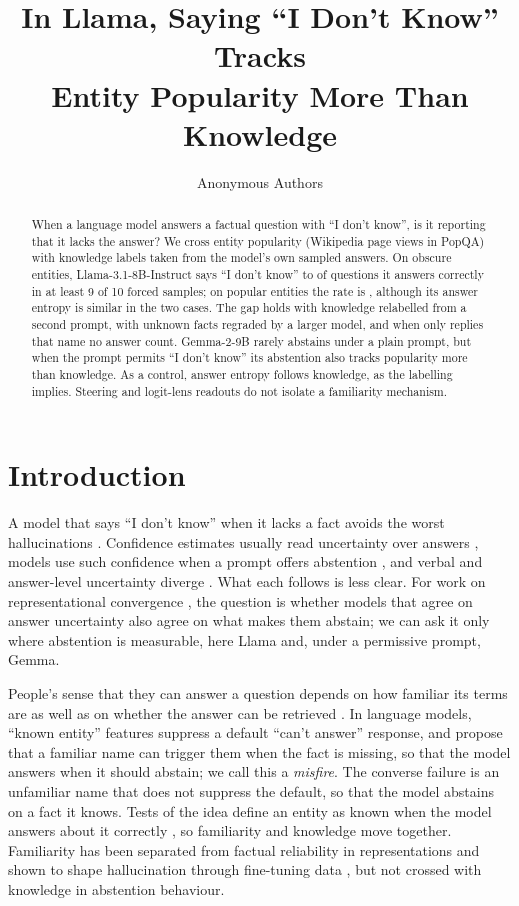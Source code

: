\documentclass{article}
\title{In Llama, Saying ``I Don't Know'' Tracks\\Entity Popularity More Than Knowledge}
\author{Anonymous Authors}
\newcommand{\idk}{``I don't know''}
\begin{document}
\maketitle

\begin{abstract}
When a language model answers a factual question with \idk, is it reporting that it lacks the answer? We cross entity popularity (Wikipedia page views in PopQA) with knowledge labels taken from the model's own sampled answers. On obscure entities, Llama-3.1-8B-Instruct says \idk{} to \tcObsKnownAbsPct{} of questions it answers correctly in at least 9 of 10 forced samples; on popular entities the rate is \tcPopKnownAbsPct, although its answer entropy is similar in the two cases. The gap holds with knowledge relabelled from a second prompt, with unknown facts regraded by a larger model, and when only replies that name no answer count. Gemma-2-9B rarely abstains under a plain prompt, but when the prompt permits \idk{} its abstention also tracks popularity more than knowledge. As a control, answer entropy follows knowledge, as the labelling implies. Steering and logit-lens readouts do not isolate a familiarity mechanism.
\end{abstract}

\section{Introduction}

A model that says \idk{} when it lacks a fact avoids the worst hallucinations \citep{kalai2025hallucinate}. Confidence estimates usually read uncertainty over answers \citep{kadavath2022know,kuhn2023semantic,stolfo2024confidence}, models use such confidence when a prompt offers abstention \citep{kumaran2026confidence}, and verbal and answer-level uncertainty diverge \citep{ji2025hedging}. What each follows is less clear. For work on representational convergence \citep{huh2024platonic}, the question is whether models that agree on answer uncertainty also agree on what makes them abstain; we can ask it only where abstention is measurable, here Llama and, under a permissive prompt, Gemma.

People's sense that they can answer a question depends on how familiar its terms are as well as on whether the answer can be retrieved \citep{reder1992,schwartz1992,koriat2001cascade}. In language models, ``known entity'' features suppress a default ``can't answer'' response, and \citet{lindsey2025biology} propose that a familiar name can trigger them when the fact is missing, so that the model answers when it should abstain; we call this a \emph{misfire}. The converse failure is an unfamiliar name that does not suppress the default, so that the model abstains on a fact it knows. Tests of the idea define an entity as known when the model answers about it correctly \citep{ferrando2025iknow}, so familiarity and knowledge move together. Familiarity has been separated from factual reliability in representations \citep{brzezinka2026bielik} and shown to shape hallucination through fine-tuning data \citep{kang2025unfamiliar}, but not crossed with knowledge in abstention behaviour.
\end{document}
